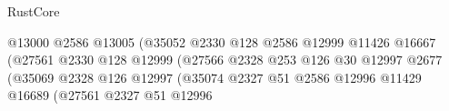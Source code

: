 \begin{lexlean}{RustCore}
\begin{coremodule}
                                                              @13000
                                                              @2586
                                                              @13005
                                                              (@35052
                                                                @2330
                                                                @128
                                                                @2586
                                                                @12999
                                                                @11426
                                                                @16667
                                                                (@27561
                                                                  @2330
                                                                  @128
                                                                  @12999
                                                                  (@27566
                                                                    @2328
                                                                    @253
                                                                    @126
                                                                    @30
                                                                    @12997
                                                                    @2677
                                                                    (@35069
                                                                      @2328
                                                                      @126
                                                                      @12997
                                                                      (@35074
                                                                        @2327
                                                                        @51
                                                                        @2586
                                                                        @12996
                                                                        @11429
                                                                        @16689
                                                                        (@27561
                                                                          @2327
                                                                          @51
                                                                          @12996

\end{coremodule}
\end{lexlean}

